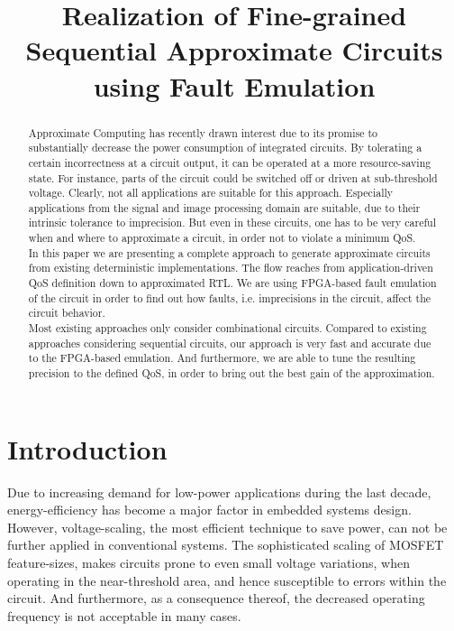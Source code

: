 \documentclass[conference]{IEEEtran}
\begin{document}
\title{Realization of Fine-grained Sequential Approximate Circuits using Fault Emulation}


\author{
\IEEEauthorblockA{}
\and
{}
\IEEEauthorblockA{}
}


\maketitle


\begin{abstract}
Approximate Computing has recently drawn interest due to its promise to substantially decrease the power consumption of integrated circuits. By tolerating a certain incorrectness at a circuit output, it can be operated at a more resource-saving state. For instance, parts of the circuit could be switched off or driven at sub-threshold voltage. Clearly, not all applications are suitable for this approach. Especially applications from the signal and image processing domain are suitable, due to their intrinsic tolerance to imprecision. But even in these circuits, one has to be very careful when and where to approximate a circuit, in order not to violate a minimum QoS.\\
In this paper we are presenting a complete approach to generate approximate circuits from existing deterministic implementations. The flow reaches from application-driven QoS definition down to approximated RTL. We are using FPGA-based fault emulation of the circuit in order to find out how faults, i.e. imprecisions in the circuit, affect the circuit behavior.\\
Most existing approaches only consider combinational circuits. Compared to existing approaches considering sequential circuits, our approach is very fast and accurate due to the FPGA-based emulation. And furthermore, we are able to tune the resulting precision to the defined QoS, in order to bring out the best gain of the approximation.
\end{abstract}

\IEEEpeerreviewmaketitle



\section{Introduction}
Due to increasing demand for low-power applications during the last decade, energy-efficiency has become a major factor in embedded systems design. However, voltage-scaling, the most efficient technique to save power, can not be further applied in conventional systems. The sophisticated scaling of MOSFET feature-sizes, makes circuits prone to even small voltage variations, when operating in the near-threshold area, and hence susceptible to errors within the circuit. And furthermore, as a consequence thereof, the decreased operating frequency is not acceptable in many cases.
\end{document}
